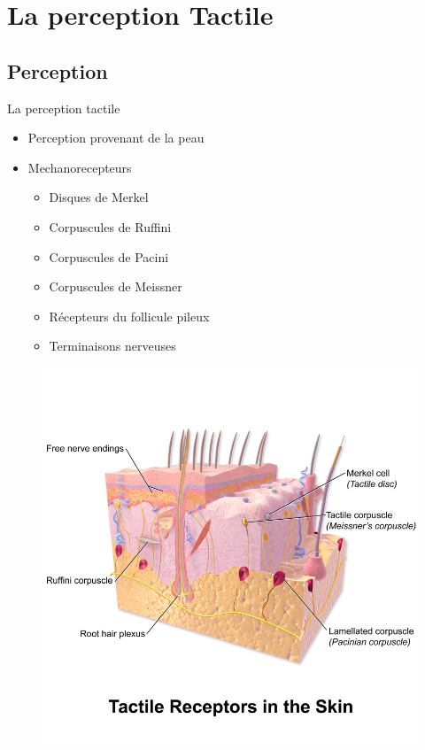 \section{La perception Tactile}
\subsection{Perception}
{
\begin{frame}{La perception tactile}
\begin{itemize}
\item Perception provenant de la peau
\end{itemize}
\begin{multicols}{2}
\begin{itemize}
\item Mechanorecepteurs
\begin{itemize}
\item Disques de Merkel
\item Corpuscules de Ruffini
\item Corpuscules de Pacini
\item Corpuscules de Meissner
\item Récepteurs du follicule pileux
\item Terminaisons nerveuses
\end{itemize}
\end{itemize}

\begin{figure}
\centering
\includegraphics[width=\linewidth]{images/tactileReceptors}
\end{figure}
\end{multicols}
\end{frame}
}

